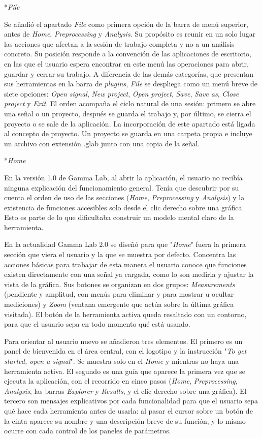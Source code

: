 \documentclass[12pt,letterpaper,oneside]{article}
\makeatletter
\newcommand{\subsubsubsection}[1]{%
  \@startsection{paragraph}{4}{\z@}{10pt plus 2pt minus 1pt}{4pt}%
    {\normalfont\normalsize\bfseries\itshape}*{#1}}
\makeatother
\begin{document}
\subsubsubsection{\textit{File}}

Se añadió el apartado \textit{File} como primera opción de la barra de menú superior, antes de \textit{Home}, \textit{Preprocessing} y \textit{Analysis}. Su propósito es reunir en un solo lugar las acciones que afectan a la sesión de trabajo completa y no a un análisis concreto. Su posición responde a la convención de las aplicaciones de escritorio, en las que el usuario espera encontrar en este menú las operaciones para abrir, guardar y cerrar su trabajo. A diferencia de las demás categorías, que presentan sus herramientas en la barra de \textit{plugins}, \textit{File} se despliega como un menú breve de siete opciones: \textit{Open signal}, \textit{New project}, \textit{Open project}, \textit{Save}, \textit{Save as}, \textit{Close project} y \textit{Exit}. El orden acompaña el ciclo natural de una sesión: primero se abre una señal o un proyecto, después se guarda el trabajo y, por último, se cierra el proyecto o se sale de la aplicación. La incorporación de este apartado está ligada al concepto de proyecto. Un proyecto se guarda en una carpeta propia e incluye un archivo con extensión .glab junto con una copia de la señal.

\subsubsubsection{\textit{Home}}

En la versión 1.0 de Gamma Lab, al abrir la aplicación, el usuario no recibía ninguna explicación del funcionamiento general. Tenía que descubrir por su cuenta el orden de uso de las secciones (\textit{Home}, \textit{Preprocessing} y \textit{Analysis}) y la existencia de funciones accesibles solo desde el clic derecho sobre una gráfica. Esto es parte de lo que dificultaba construir un modelo mental claro de la herramienta.

En la actualidad Gamma Lab 2.0 se diseñó para que "\textit{Home}" fuera la primera sección que viera el usuario y la que se muestra por defecto. Concentra las acciones básicas para trabajar de esta manera el usuario conoce que funciones existen directamente con una señal ya cargada, como lo son medirla y ajustar la vista de la gráfica. Sus botones se organizan en dos grupos: \textit{Measurements} (pendiente y amplitud, con menús para eliminar y para mostrar u ocultar mediciones) y \textit{Zoom} (ventana emergente que actúa sobre la última gráfica visitada). El botón de la herramienta activa queda resaltado con un contorno, para que el usuario sepa en todo momento qué está usando.

Para orientar al usuario nuevo se añadieron tres elementos. El primero es un panel de bienvenida en el área central, con el logotipo y la instrucción "\textit{To get started, open a signal}". Se muestra solo en el \textit{Home} y mientras no haya una herramienta activa. El segundo es una guía que aparece la primera vez que se ejecuta la aplicación, con el recorrido en cinco pasos (\textit{Home}, \textit{Preprocessing}, \textit{Analysis}, las barras \textit{Explorer} y \textit{Results}, y el clic derecho sobre una gráfica). El tercero son mensajes explicativos por cada funcionalidad para que el usuario sepa qué hace cada herramienta antes de usarla: al pasar el cursor sobre un botón de la cinta aparece su nombre y una descripción breve de su función, y lo mismo ocurre con cada control de los paneles de parámetros.
\end{document}
